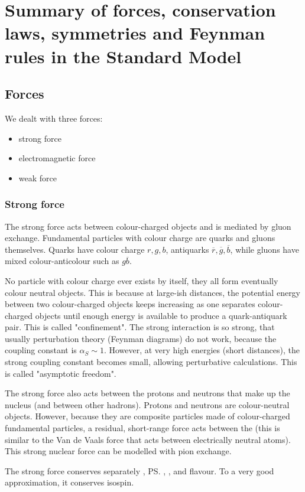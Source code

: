 \section{Summary of forces, conservation laws, symmetries and Feynman rules in the Standard Model}
\subsection{Forces}
We dealt with three forces:
\begin{itemize}
\item strong force
\item electromagnetic force
\item weak force
\end{itemize}

\subsubsection{Strong force}
The strong force acts between colour-charged objects and is mediated by gluon exchange. Fundamental particles with colour charge are quarks and gluons themselves. Quarks have colour charge $r, g, b$, antiquarks $\overline{r}, \overline{g}, \overline{b}$, while gluons have mixed colour-anticolour such as $g\overline{b}$.

No particle with colour charge ever exists by itself, they all form eventually colour neutral objects. This is because at large-ish distances, the potential energy between two colour-charged objects keeps increasing as one separates colour-charged objects until enough energy is available to produce a quark-antiquark pair. This is called "confinement". The strong interaction is so strong, that usually perturbation theory (Feynman diagrams) do not work, because the coupling constant is $\alpha_S \sim 1$. However, at very high energies (short distances), the strong coupling constant becomes small, allowing perturbative calculations. This is called "asymptotic freedom".

The strong force also acts between the protons and neutrons that make up the nucleus (and between other hadrons). Protons and neutrons are colour-neutral objects. However, because they are composite particles made of colour-charged fundamental particles, a residual, short-range force acts between the (this is similar to the Van de Vaals force that acts between electrically neutral atoms). This strong nuclear force can be modelled with pion exchange.

The strong force conserves separately \cs, \ps, \cp, and flavour. To a very good approximation, it conserves isospin.

